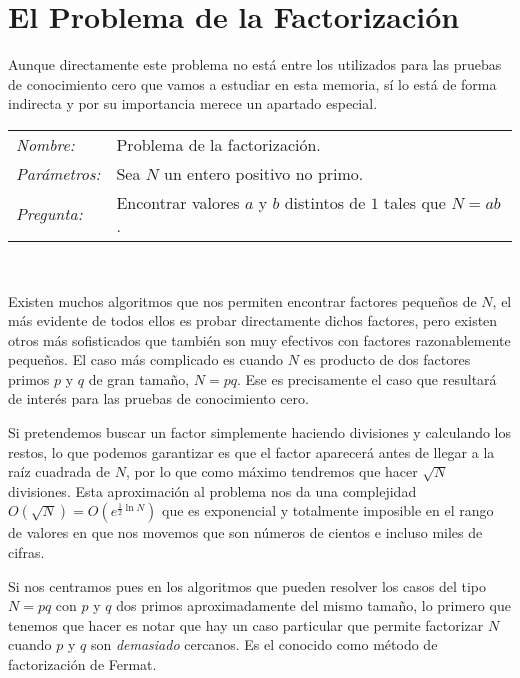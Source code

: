 \section{El Problema de la Factorizaci\'on}

Aunque directamente este problema no est\'a entre los utilizados para las pruebas
de conocimiento cero que vamos a estudiar en esta memoria, s\'i lo est\'a de forma
indirecta y por su importancia merece un apartado especial.

\hfil

\begin{tabular}{|ll}\index{Problema de la Factorización}
	\textit{Nombre:} & Problema de la factorizaci\'on. \\
	\textit{Parámetros:} & Sea $N$ un entero positivo no primo. \\
	\textit{Pregunta:} & Encontrar valores $a$ y $b$ distintos de $1$ tales que $N = ab$. \\
\end{tabular}
\\

\hfil

Existen muchos algoritmos que nos permiten encontrar factores peque\~nos de $N$,
el m\'as evidente de todos ellos es probar directamente dichos factores, pero existen otros
m\'as sofisticados que tambi\'en son muy efectivos con factores razonablemente
peque\~nos. El caso m\'as complicado es cuando $N$ es producto de dos factores primos $p$ y $q$
de gran tama\~no, $N = pq$. Ese es precisamente el caso que resultar\'a de
inter\'es para las pruebas de conocimiento cero.

Si pretendemos buscar un factor simplemente haciendo divisiones y calculando los
restos, lo que podemos garantizar es que el factor aparecer\'a antes de llegar a
la ra\'iz cuadrada de $N$, por lo que como m\'aximo tendremos que hacer $\sqrt{N}$
divisiones. Esta aproximaci\'on al problema nos da una complejidad
$O(\sqrt{N}) = O(e^{\frac{1}{2}\ln N})$ que es exponencial y totalmente imposible
en el rango de valores en que nos movemos que son n\'umeros de cientos e incluso
miles de cifras.

Si nos centramos pues en los algoritmos que pueden resolver los casos del tipo
$N = pq$ con $p$ y $q$ dos primos aproximadamente del mismo tama\~no, lo primero que tenemos que
hacer es notar que hay un caso particular que permite factorizar $N$ cuando $p$
y $q$ son {\em demasiado} cercanos. Es el conocido como m\'etodo de factorizaci\'on
de Fermat.

